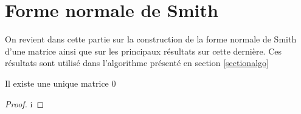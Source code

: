 \section{Forme normale de Smith}
\label{smith} 
On revient dans cette partie sur la construction de la forme normale de Smith d'une matrice ainsi que sur les principaux résultats sur cette dernière. Ces résultats sont utilisé dans l'algorithme présenté en section \ref{sectionalgo} 

\begin{propriete}
	Il existe une unique matrice $0$ 


\end{propriete}

\begin{proof}
i
\end{proof}

